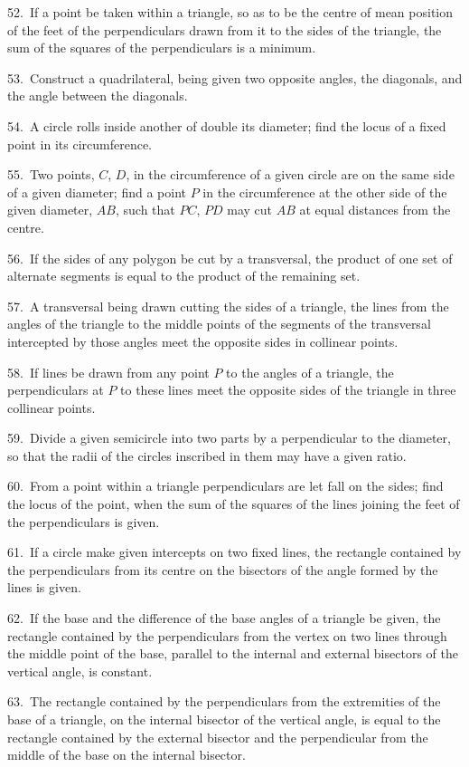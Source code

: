 \documentclass[oneside]{book}
\begin{document}
\begin{footnotesize}
52.~If a point be taken within a triangle, so as to be the centre
of mean position of the feet of the perpendiculars drawn from it
to the sides of the triangle, the sum of the squares of the perpendiculars
is a minimum.

53.~Construct a quadrilateral, being given two opposite angles,
the diagonals, and the angle between the diagonals.

54.~A circle rolls inside another of double its diameter; find
the locus of a fixed point in its circumference.

55.~Two points, $C$, $D$, in the circumference of a given circle are
on the same side of a given diameter; find a point $P$ in the circumference
at the other side of the given diameter, $AB$, such that
$PC$, $PD$ may cut $AB$ at equal distances from the centre.

56.~If the sides of any polygon be cut by a transversal, the
product of one set of alternate segments is equal to the product
of the remaining set.

57.~A transversal being drawn cutting the sides of a triangle,
the lines from the angles of the triangle to the middle points
of the segments of the transversal intercepted by those angles
meet the opposite sides in collinear points.

58.~If lines be drawn from any point $P$ to the angles of a
triangle, the perpendiculars at $P$ to these lines meet the opposite
sides of the triangle in three collinear points.


59.~Divide a given semicircle into two parts by a perpendicular
to the diameter, so that the radii of the circles inscribed in them
may have a given ratio.

60.~From a point within a triangle perpendiculars are let fall
on the sides; find the locus of the point, when the sum of the
squares of the lines joining the feet of the perpendiculars is
given.

61.~If a circle make given intercepts on two fixed lines, the
rectangle contained by the perpendiculars from its centre on the
bisectors of the angle formed by the lines is given.

62.~If the base and the difference of the base angles of a
triangle be given, the rectangle contained by the perpendiculars
from the vertex on two lines through the middle point of the
base, parallel to the internal and external bisectors of the vertical
angle, is constant.

63.~The rectangle contained by the perpendiculars from the
extremities of the base of a triangle, on the internal bisector of
the vertical angle, is equal to the rectangle contained by the
external bisector and the perpendicular from the middle of the
base on the internal bisector.


\end{footnotesize}
\end{document}
